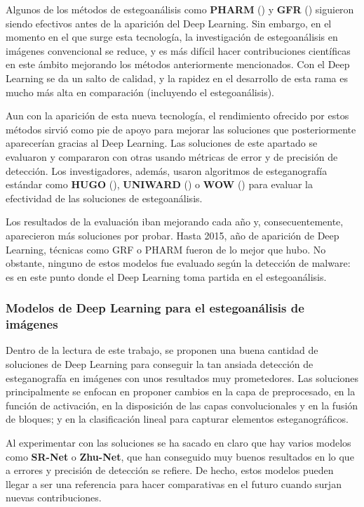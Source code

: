 Algunos de los métodos de estegoanálisis como \textbf{PHARM} (\cite{pharm}) y \textbf{GFR} (\cite{gfr}) siguieron siendo efectivos antes de la aparición del Deep Learning. Sin embargo, en el momento en el que surge esta tecnología, la investigación de estegoanálisis en imágenes convencional se reduce, y es más difícil hacer contribuciones científicas en este ámbito mejorando los métodos anteriormente mencionados. Con el Deep Learning se da un salto de calidad, y la rapidez en el desarrollo de esta rama es mucho más alta en comparación (incluyendo el estegoanálisis). %

Aun con la aparición de esta nueva tecnología, el rendimiento ofrecido por estos métodos sirvió como pie de apoyo para mejorar las soluciones que posteriormente aparecerían gracias al Deep Learning. Las soluciones de este apartado se evaluaron y compararon con otras usando métricas de error y de precisión de detección. Los investigadores, además, usaron algoritmos de esteganografía estándar como \textbf{HUGO} (\cite{hugo}), \textbf{UNIWARD} (\cite{uniward}) o \textbf{WOW} (\cite{wow}) para evaluar la efectividad de las soluciones de estegoanálisis.%

Los resultados de la evaluación iban mejorando cada año y, consecuentemente, aparecieron más soluciones por probar. Hasta 2015, año de aparición de Deep Learning, técnicas como GRF o PHARM fueron de lo mejor que hubo. No obstante, ninguno de estos modelos fue evaluado según la detección de malware: es en este punto donde el Deep Learning toma partida en el estegoanálisis.

\subsubsection{Modelos de Deep Learning para el estegoanálisis de imágenes}

Dentro de la lectura de este trabajo, se proponen una buena cantidad de soluciones de Deep Learning para conseguir la tan ansiada detección de esteganografía en imágenes con unos resultados muy prometedores. Las soluciones principalmente se enfocan en proponer cambios en la capa de preprocesado, en la función de activación, en la disposición de las capas convolucionales y en la fusión de bloques; y en la clasificación lineal para capturar elementos esteganográficos.

Al experimentar con las soluciones se ha sacado en claro que hay varios modelos como \textbf{SR-Net} o \textbf{Zhu-Net}, que han conseguido muy buenos resultados en lo que a errores y precisión de detección se refiere. De hecho, estos modelos pueden llegar a ser una referencia para hacer comparativas en el futuro cuando surjan nuevas contribuciones.

